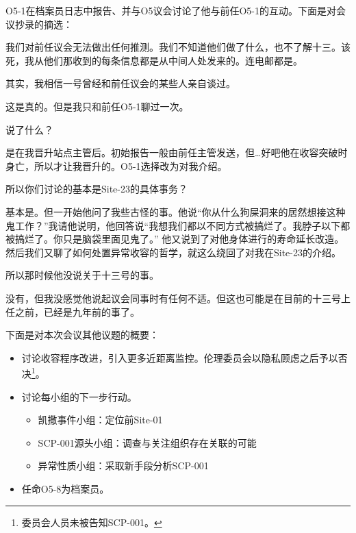 O5-1在档案员日志中报告、并与O5议会讨论了他与前任O5-1的互动。下面是对会议抄录的摘选：

\begin{scpbox}

我们对前任议会无法做出任何推测。我们不知道他们做了什么，也不了解十三。该死，我从他们那收到的每条信息都是从中间人处发来的。连电邮都是。

其实，我相信一号曾经和前任议会的某些人亲自谈过。


这是真的。但是我只和前任O5-1聊过一次。

说了什么？

是在我晋升站点主管后。初始报告一般由前任主管发送，但…好吧他在收容突破时身亡，所以才让我晋升的。O5-1选择改为对我介绍。

所以你们讨论的基本是Site-23的具体事务？

基本是。但一开始他问了我些古怪的事。他说“你从什么狗屎洞来的居然想接这种鬼工作？”我请他说明，他回答说“我想我们都以不同方式被搞烂了。我脖子以下都被搞烂了。你只是脑袋里面见鬼了。”
 他又说到了对他身体进行的寿命延长改造。然后我们又聊了如何处置异常收容的哲学，就这么绕回了对我在Site-23的介绍。

所以那时候他没说关于十三号的事。

没有，但我没感觉他说起议会同事时有任何不适。但这也可能是在目前的十三号上任之前，已经是九年前的事了。

\end{scpbox}

下面是对本次会议其他议题的概要：

\begin{itemize}
\item 讨论收容程序改进，引入更多近距离监控。伦理委员会以隐私顾虑之后予以否决\footnote{委员会人员未被告知SCP-001。}。
\item 讨论每小组的下一步行动。
\begin{itemize}
\item 凯撒事件小组：定位前Site-01
\item SCP-001源头小组：调查与关注组织存在关联的可能
\item 异常性质小组：采取新手段分析SCP-001
\end{itemize}
\item 任命O5-8为档案员。
\end{itemize}


